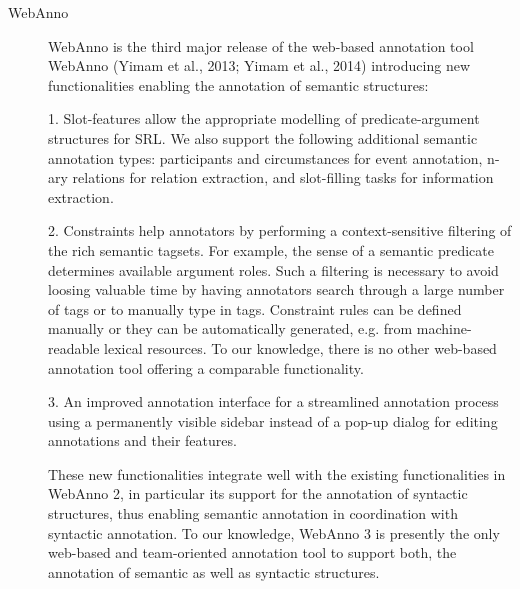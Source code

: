 \begin{description}
    \item[WebAnno]
    WebAnno is the third major release of the web-based annotation tool WebAnno (Yimam et al., 2013;
    Yimam et al., 2014) introducing new functionalities enabling the annotation of semantic structures:

    1. Slot-features allow the appropriate modelling of predicate-argument structures for SRL. We also
    support the following additional semantic annotation types: participants and circumstances for event
    annotation, n-ary relations for relation extraction, and slot-filling tasks for information extraction.

    2. Constraints help annotators by performing a context-sensitive filtering of the rich semantic tagsets.
    For example, the sense of a semantic predicate determines available argument roles. Such a filtering is
    necessary to avoid loosing valuable time by having annotators search through a large number of tags
    or to manually type in tags. Constraint rules can be defined manually or they can be automatically
    generated, e.g. from machine-readable lexical resources. To our knowledge, there is no other
    web-based annotation tool offering a comparable functionality.

    3. An improved annotation interface for a streamlined annotation process using a permanently visible
    sidebar instead of a pop-up dialog for editing annotations and their features.

    These new functionalities integrate well with the existing functionalities in WebAnno 2, in particular its
    support for the annotation of syntactic structures, thus enabling semantic annotation in coordination with
    syntactic annotation. To our knowledge, WebAnno 3 is presently the only web-based and team-oriented
    annotation tool to support both, the annotation of semantic as well as syntactic structures.


\end{description}

